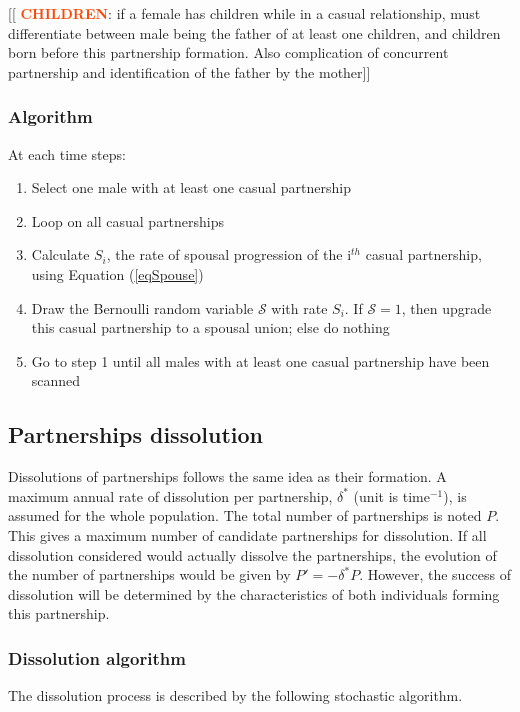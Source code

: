 \documentclass[11pt, onecolumn]{article}
\newcommand{\warning}[1]{\textbf{\textcolor{OrangeRed}{#1}}}
\begin{document}
[[ \warning{CHILDREN}: if a female has children while in a casual relationship, must differentiate between male being the father of at least one children, and children born before this partnership formation. Also complication of concurrent partnership and identification of the father by the mother]]

\subsubsection{Algorithm}

At each time steps:
\begin{enumerate} 
\item Select one male with at least one casual partnership
\item Loop on all casual partnerships
\item Calculate $S_i$, the rate of spousal progression of the i$^{th}$ casual partnership, using Equation (\ref{eqSpouse})
\item Draw the Bernoulli random variable $\mathcal{S}$ with rate $S_i$. If $\mathcal{S}=1$, then upgrade this casual partnership to a spousal union; else do nothing
\item Go to step 1 until all males with at least one casual partnership have been scanned
\end{enumerate}



\subsection{Partnerships dissolution}

Dissolutions of partnerships follows the same idea as their formation. A maximum annual rate of dissolution per partnership, $\delta^*$ (unit is time$^{-1}$), is assumed for the whole population. The total number of partnerships is noted $P$. This gives a maximum number of candidate partnerships for dissolution. 
If all dissolution considered would actually dissolve the partnerships, the evolution of the number of partnerships would be given by $P'=-\delta^*P$.
However, the success of dissolution will be determined by the characteristics of both individuals forming this partnership.

\subsubsection{Dissolution algorithm}
The dissolution process is described by the following stochastic algorithm.
\end{document}
